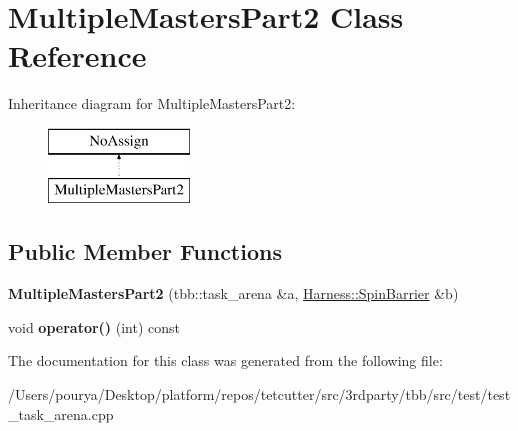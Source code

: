 \hypertarget{classMultipleMastersPart2}{}\section{Multiple\+Masters\+Part2 Class Reference}
\label{classMultipleMastersPart2}
Inheritance diagram for Multiple\+Masters\+Part2\+:\begin{figure}[H]
\begin{center}
\leavevmode
\includegraphics[height=2.000000cm]{classMultipleMastersPart2}
\end{center}
\end{figure}
\subsection*{Public Member Functions}
\begin{DoxyCompactItemize}
\item 
\hypertarget{classMultipleMastersPart2_a8f34ccb4694128e071bdb1bbe7463455}{}{\bfseries Multiple\+Masters\+Part2} (tbb\+::task\+\_\+arena \&a, \hyperlink{classHarness_1_1SpinBarrier}{Harness\+::\+Spin\+Barrier} \&b)\label{classMultipleMastersPart2_a8f34ccb4694128e071bdb1bbe7463455}

\item 
\hypertarget{classMultipleMastersPart2_aec57ca5f940bc0ed5d1ca826e5faa662}{}void {\bfseries operator()} (int) const \label{classMultipleMastersPart2_aec57ca5f940bc0ed5d1ca826e5faa662}

\end{DoxyCompactItemize}


The documentation for this class was generated from the following file\+:\begin{DoxyCompactItemize}
\item 
/\+Users/pourya/\+Desktop/platform/repos/tetcutter/src/3rdparty/tbb/src/test/test\+\_\+task\+\_\+arena.\+cpp\end{DoxyCompactItemize}
